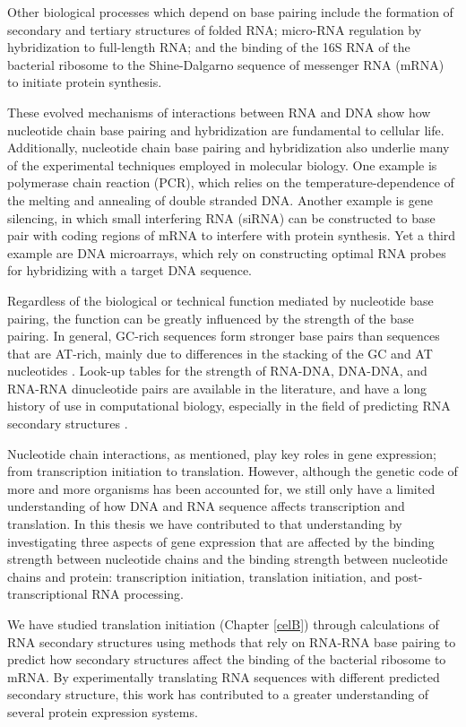 Other biological processes which depend on base pairing include the formation
of secondary and tertiary structures of folded RNA; micro-RNA regulation by
hybridization to full-length RNA; and the binding of the 16S RNA of the
bacterial ribosome to the Shine-Dalgarno sequence of messenger RNA (mRNA) to
initiate protein synthesis.

These evolved mechanisms of interactions between RNA and DNA show how
nucleotide chain base pairing and hybridization are fundamental to cellular
life. Additionally, nucleotide chain base pairing and hybridization also
underlie many of the experimental techniques employed in molecular biology.
One example is polymerase chain reaction (PCR), which relies on the
temperature-dependence of the melting and annealing of double stranded DNA.
Another example is gene silencing, in which small interfering RNA (siRNA) can
be constructed to base pair with coding regions of mRNA to interfere with
protein synthesis. Yet a third example are DNA microarrays, which rely on
constructing optimal RNA probes for hybridizing with a target DNA sequence.

Regardless of the biological or technical function mediated by nucleotide base
pairing, the function can be greatly influenced by the strength of the base
pairing. In general, GC-rich sequences form stronger base pairs than sequences
that are AT-rich, mainly due to differences in the stacking of the GC and AT
nucleotides \cite{yakovchuk_base-stacking_2006}. Look-up tables for the
strength of RNA-DNA, DNA-DNA, and RNA-RNA dinucleotide pairs are available in
the literature, and have a long history of use in computational biology,
especially in the field of predicting RNA secondary structures
\cite{mathews_prediction_2006}. 

Nucleotide chain interactions, as mentioned, play key roles in gene expression;
from transcription initiation to translation. However, although the genetic
code of more and more organisms has been accounted for, we still only have a
limited understanding of how DNA and RNA sequence affects transcription and
translation. In this thesis we have contributed to that understanding by
investigating three aspects of gene expression that are affected by the binding
strength between nucleotide chains and the binding strength between nucleotide
chains and protein: transcription initiation, translation initiation, and
post-transcriptional RNA processing.

We have studied translation initiation (Chapter \ref{celB}) through
calculations of RNA secondary structures using methods that rely on RNA-RNA
base pairing to predict how secondary structures affect the binding of the
bacterial ribosome to mRNA. By experimentally translating RNA sequences with
different predicted secondary structure, this work has contributed to a greater
understanding of several protein expression systems.

